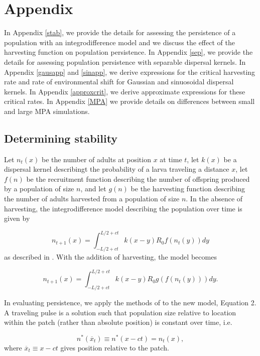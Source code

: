 \documentclass[12pt,english]{article}
\begin{document}
\appendix
\section{Appendix}
In Appendix \ref{stab}, we provide the details for assessing the persistence of a population with an integrodifference model and we discuss the effect of the harvesting function on population persistence.  In Appendix \ref{sep}, we provide the details for assessing population persistence with separable dispersal kernels.  In Appendix \ref{gausapp} and \ref{sinapp}, we derive expressions for the critical harvesting rate and rate of environmental shift for Gaussian and sinuosoidal dispersal kernels.  In Appendix \ref{approxcrit}, we derive approximate expressions for these critical rates. In Appendix \ref{MPA} we provide details on differences between small and large MPA simulations. 

\subsection{Determining stability \label{stab}}
Let $n_t(x)$ be the number of adults at position $x$ at time $t$, let $k(x)$ be a dispersal kernel describingt the probability of a larva traveling a distance $x$, let $f(n)$ be the recruitment function describing the number of offspring produced by a population of size $n$, and let $g(n)$ be the harvesting function describing the number of adults harvested from a population of size $n$.  In the absence of harvesting, the integrodifference model describing the population over time is given by 

\begin{equation} n_{t+1}(x)=\int_{-L/2+ct}^{L/2+ct}k(x-y)R_0f(n_t(y))dy \label{integro} \end{equation}
as described in \citet{ZhouKot2011}.  With the addition of harvesting, the model becomes

\begin{equation} n_{t+1}(x)=\int_{-L/2+ct}^{L/2+ct}k(x-y)R_0g(f(n_t(y)))dy. \label{integro} \end{equation}

In evaluating persistence, we apply the methods of \citet{ZhouKot2011} to the new model, Equation 2.  A traveling pulse is a solution such that population size relative to location within the patch (rather than absolute position) is constant over time, i.e. 

\begin{equation*}
n^*(\overline{x}_t)\equiv n^*(x-ct)=n_t(x),   \label{trav} 
\end{equation*}
where $\overline{x}_t\equiv x-ct$ gives position relative to the patch. 
\end{document}
